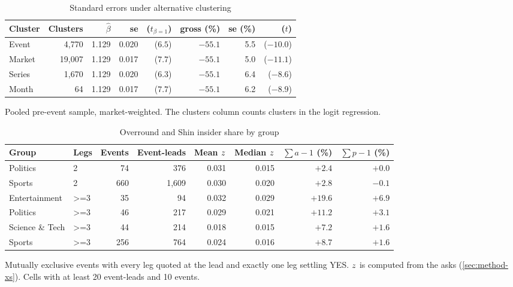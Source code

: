 \begin{table}[htbp]
\centering
\begin{threeparttable}
\caption{Standard errors under alternative clustering}\label{tab:xs-cluster}
\scriptsize
\begin{tabular}{@{}lrrrrrrr@{}}
\toprule
Cluster & Clusters & $\hat\beta$ & se & ($t_{\beta=1}$) & \LS{} gross (\%) & se (\%) & ($t$) \\
\midrule
Event & 4{,}770 & 1.129 & 0.020 & ($6.5$) & $-55.1$ & 5.5 & ($-10.0$) \\
Market & 19{,}007 & 1.129 & 0.017 & ($7.7$) & $-55.1$ & 5.0 & ($-11.1$) \\
Series & 1{,}670 & 1.129 & 0.020 & ($6.3$) & $-55.1$ & 6.4 & ($-8.6$) \\
Month & 64 & 1.129 & 0.017 & ($7.7$) & $-55.1$ & 6.2 & ($-8.9$) \\
\bottomrule
\end{tabular}
\begin{tablenotes}\footnotesize
\item Pooled pre-event sample, market-weighted. The clusters column counts clusters in the logit
regression.
\end{tablenotes}
\end{threeparttable}
\end{table}

\begin{table}[htbp]
\centering
\begin{threeparttable}
\caption{Overround and Shin insider share by group}\label{tab:xs-shin-group}
\scriptsize
\begin{tabular}{@{}llrrrrrr@{}}
\toprule
Group & Legs & Events & Event-leads & Mean $z$ & Median $z$ & $\sum a-1$ (\%) & $\sum p-1$ (\%) \\
\midrule
Politics & 2 & 74 & 376 & 0.031 & 0.015 & $+2.4$ & $+0.0$ \\
Sports & 2 & 660 & 1{,}609 & 0.030 & 0.020 & $+2.8$ & $-0.1$ \\
Entertainment & >=3 & 35 & 94 & 0.032 & 0.029 & $+19.6$ & $+6.9$ \\
Politics & >=3 & 46 & 217 & 0.029 & 0.021 & $+11.2$ & $+3.1$ \\
Science \& Tech & >=3 & 44 & 214 & 0.018 & 0.015 & $+7.2$ & $+1.6$ \\
Sports & >=3 & 256 & 764 & 0.024 & 0.016 & $+8.7$ & $+1.6$ \\
\bottomrule
\end{tabular}
\begin{tablenotes}\footnotesize
\item Mutually exclusive events with every leg quoted at the lead and exactly one leg settling
YES. $z$ is computed from the asks (\cref{sec:method-xs}). Cells with at least 20 event-leads
and 10 events.
\end{tablenotes}
\end{threeparttable}
\end{table}

